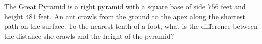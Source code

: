 The Great Pyramid is a right pyramid with a square base of side $756$ feet and height $481$ feet. An ant crawls from the ground to the apex along the shortest path on the surface. To the nearest tenth of a foot, what is the difference between the distance she crawls and the height of the pyramid?
